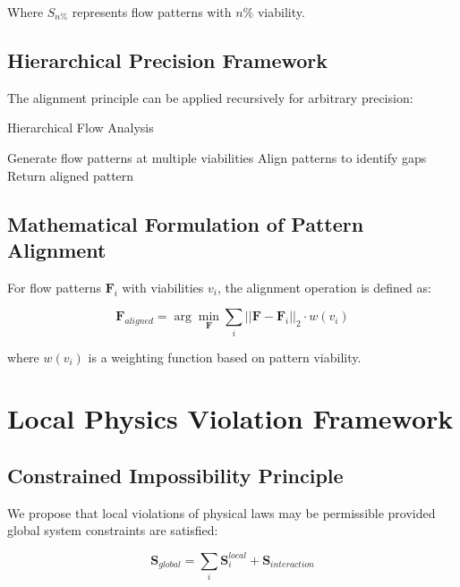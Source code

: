 \documentclass[12pt,a4paper]{article}
\begin{document}
Where $S_{n\%}$ represents flow patterns with $n\%$ viability.

\subsection{Hierarchical Precision Framework}

The alignment principle can be applied recursively for arbitrary precision:

\begin{algorithm}
\caption{Hierarchical Flow Analysis}
\begin{algorithmic}
    \State Generate flow patterns at multiple viabilities
    \State Align patterns to identify gaps
            \State {}
        \EndFor
    \EndIf
    \State Return aligned pattern
\EndProcedure
\end{algorithmic}
\end{algorithm}

\subsection{Mathematical Formulation of Pattern Alignment}

For flow patterns $\mathbf{F}_i$ with viabilities $v_i$, the alignment operation is defined as:

\begin{equation}
\mathbf{F}_{aligned} = \arg\min_{\mathbf{F}} \sum_{i} ||\mathbf{F} - \mathbf{F}_i||_2 \cdot w(v_i)
\end{equation}

where $w(v_i)$ is a weighting function based on pattern viability.

\section{Local Physics Violation Framework}

\subsection{Constrained Impossibility Principle}

We propose that local violations of physical laws may be permissible provided global system constraints are satisfied:

\begin{equation}
\mathbf{S}_{global} = \sum_{i} \mathbf{S}_i^{local} + \mathbf{S}_{interaction}
\end{equation}
\end{document}
